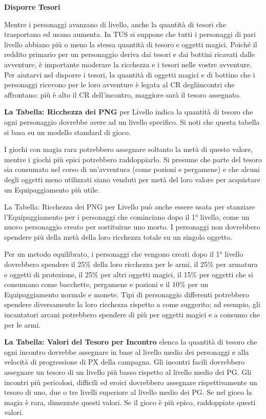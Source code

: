 \documentclass[a4paper,11pt,twoside,openany]{book}
\begin{document}
{\textbf{Disporre Tesori}

Mentre i personaggi avanzano di livello, anche la quantità di tesori che trasportano ed usano aumenta. In TUS si suppone che tutti i personaggi di pari livello abbiano più o meno la stessa quantità di tesoro e oggetti magici. Poiché il reddito primario per un personaggio deriva dai tesori e dai bottini ricavati dalle avventure, è importante moderare la ricchezza e i tesori nelle vostre avventure. Per aiutarvi nel disporre i tesori, la quantità di oggetti magici e di bottino che i personaggi ricevono per le loro avventure è legata al CR degliincontri che affrontano: più è alto il CR dell'incontro, maggiore sarà il tesoro assegnato.

\textbf{La Tabella: Ricchezza dei PNG} per Livello indica la quantità di tesoro che ogni personaggio dovrebbe avere ad un livello specifico. Si noti che questa tabella si basa su un modello standard di gioco.

I giochi con magia rara potrebbero assegnare soltanto la metà di questo valore, mentre i giochi più epici potrebbero raddoppiarlo. Si presume che parte del tesoro sia consumato nel corso di un'avventura (come pozioni e pergamene) e che alcuni degli oggetti meno utilizzati siano venduti per metà del loro valore per acquistare un Equipaggiamento più utile.

La Tabella: Ricchezza dei PNG per Livello può anche essere usata per stanziare l'Equipaggiamento per i personaggi che cominciano dopo il 1° livello, come un nuovo personaggio creato per sostituirne uno morto. I personaggi non dovrebbero spendere più della metà della loro ricchezza totale su un singolo oggetto.

Per un metodo equilibrato, i personaggi che vengono creati dopo il 1° livello dovrebbero spendere il 25\% della loro ricchezza per le armi, il 25\% per armatura e oggetti di protezione, il 25\% per altri oggetti magici, il 15\% per oggetti che si consumano come bacchette, pergamene e pozioni e il 10\% per un Equipaggiamento normale e monete. Tipi di personaggio differenti potrebbero spendere diversamente la loro ricchezza rispetto a come suggerito; ad esempio, gli incantatori arcani potrebbero spendere di più per oggetti magici e a consumo che per le armi.

\textbf{La Tabella: Valori del Tesoro per Incontro} elenca la quantità di tesoro che ogni incontro dovrebbe assegnare in base al livello medio dei personaggi e alla velocità di progressione di PX della campagna. Gli incontri facili dovrebbero assegnare un tesoro di un livello più basso rispetto al livello medio dei PG. Gli incontri più pericolosi, difficili ed eroici dovrebbero assegnare rispettivamente un tesoro di uno, due o tre livelli superiore al livello medio dei PG. Se nel gioco la magia è rara, dimezzate questi valori. Se il gioco è più epico, raddoppiate questi valori.

}
\end{document}
